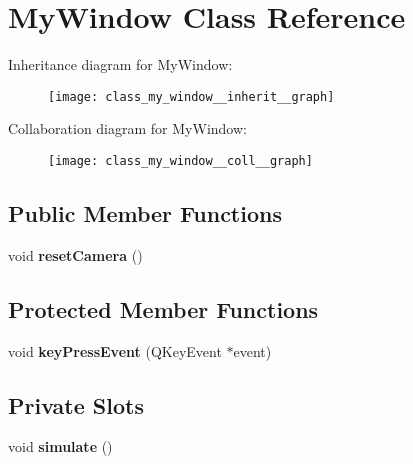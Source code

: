 \hypertarget{class_my_window}{\section{My\-Window Class Reference}
\label{class_my_window}
}


Inheritance diagram for My\-Window\-:\nopagebreak
\begin{figure}[H]
\begin{center}
\leavevmode
\texttt{[image: class\_my\_window\_\_inherit\_\_graph]}
\end{center}
\end{figure}


Collaboration diagram for My\-Window\-:\nopagebreak
\begin{figure}[H]
\begin{center}
\leavevmode
\texttt{[image: class\_my\_window\_\_coll\_\_graph]}
\end{center}
\end{figure}
\subsection*{Public Member Functions}
\begin{DoxyCompactItemize}
\item 
\hypertarget{class_my_window_a42c07be4c6795c9a1858b63d28b30eb0}{void {\bfseries reset\-Camera} ()}\label{class_my_window_a42c07be4c6795c9a1858b63d28b30eb0}

\end{DoxyCompactItemize}
\subsection*{Protected Member Functions}
\begin{DoxyCompactItemize}
\item 
\hypertarget{class_my_window_aa773620138509c878d8ebe27961b5e9c}{void {\bfseries key\-Press\-Event} (Q\-Key\-Event $\ast$event)}\label{class_my_window_aa773620138509c878d8ebe27961b5e9c}

\end{DoxyCompactItemize}
\subsection*{Private Slots}
\begin{DoxyCompactItemize}
\item 
\hypertarget{class_my_window_a06c416f5d60e88b134f22149cdbfd185}{void {\bfseries simulate} ()}\label{class_my_window_a06c416f5d60e88b134f22149cdbfd185}

\end{DoxyCompactItemize}
